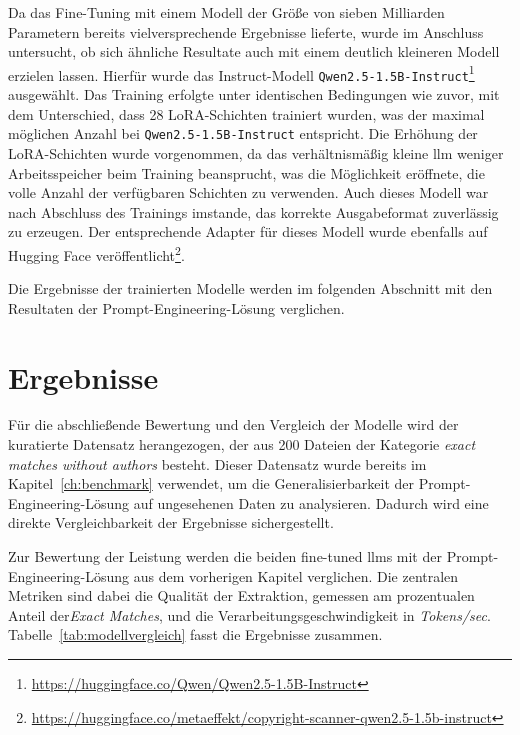 Da das Fine-Tuning mit einem Modell der Größe von sieben Milliarden Parametern bereits vielversprechende Ergebnisse lieferte, wurde im Anschluss untersucht, ob sich ähnliche Resultate auch mit einem deutlich kleineren Modell erzielen lassen.
Hierfür wurde das Instruct-Modell \texttt{Qwen2.5-1.5B-Instruct}\footnote{\url{https://huggingface.co/Qwen/Qwen2.5-1.5B-Instruct}} ausgewählt.
Das Training erfolgte unter identischen Bedingungen wie zuvor, mit dem Unterschied, dass 28 LoRA-Schichten trainiert wurden, was der maximal möglichen Anzahl bei \texttt{Qwen2.5-1.5B-Instruct} entspricht.
Die Erhöhung der LoRA-Schichten wurde vorgenommen, da das verhältnismäßig kleine \gls{llm} weniger Arbeitsspeicher beim Training beansprucht, was die Möglichkeit eröffnete, die volle Anzahl der verfügbaren Schichten zu verwenden.
Auch dieses Modell war nach Abschluss des Trainings imstande, das korrekte Ausgabeformat zuverlässig zu erzeugen.
Der entsprechende Adapter für dieses Modell wurde ebenfalls auf Hugging Face veröffentlicht\footnote{\url{https://huggingface.co/metaeffekt/copyright-scanner-qwen2.5-1.5b-instruct}}.

Die Ergebnisse der trainierten Modelle werden im folgenden Abschnitt mit den Resultaten der Prompt-Engineering-Lösung verglichen.

\section{Ergebnisse}\label{sec:lora-ergebnisse}

Für die abschließende Bewertung und den Vergleich der Modelle wird der kuratierte Datensatz herangezogen, der aus \num{200} Dateien der Kategorie \textit{exact matches without authors} besteht.
Dieser Datensatz wurde bereits im Kapitel~\ref{ch:benchmark} verwendet, um die Generalisierbarkeit der Prompt-Engineering-Lösung auf ungesehenen Daten zu analysieren.
Dadurch wird eine direkte Vergleichbarkeit der Ergebnisse sichergestellt.

Zur Bewertung der Leistung werden die beiden fine-tuned \glspl{llm} mit der Prompt-Engineering-Lösung aus dem vorherigen Kapitel verglichen.
Die zentralen Metriken sind dabei die Qualität der Extraktion, gemessen am prozentualen Anteil der\textit{Exact Matches}, und die Verarbeitungsgeschwindigkeit in \textit{Tokens/sec}.
Tabelle~\ref{tab:modellvergleich} fasst die Ergebnisse zusammen.

